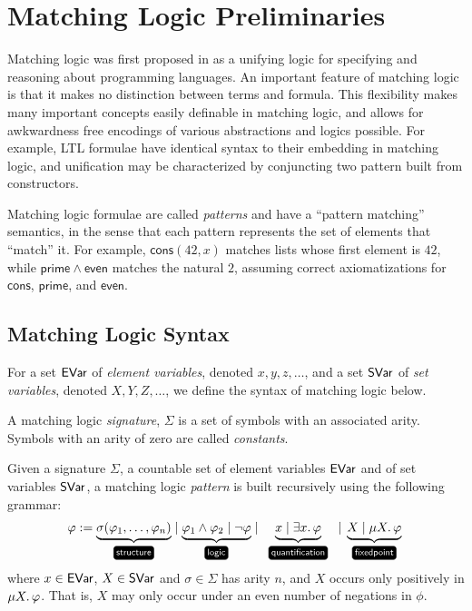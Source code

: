 \hypertarget{sec:ml-prelims}{%
\section{Matching Logic Preliminaries}\label{sec:ml-prelims}}

Matching logic was first proposed in \cite{matchinglogiclmcs} as a unifying logic
for specifying and reasoning about programming languages.
An important feature of matching logic is that it makes no distinction between terms and formula.
This flexibility makes many important concepts easily definable in matching logic,
and allows for awkwardness free encodings of various abstractions and logics possible.
For example,
LTL formulae have identical syntax to their embedding in matching logic,
and unification may be characterized by conjuncting two pattern built from constructors.

Matching logic formulae are called \emph{patterns}
and have a ``pattern matching'' semantics,
in the sense that each pattern represents the set of elements that ``match'' it.
For example, \(\mathsf{cons}(42, x)\) matches lists whose first element is \(42\),
while \(\mathsf{prime} \land \mathsf{even}\) matches the natural \(2\),
assuming correct axiomatizations for \(\mathsf{cons}\), \(\mathsf{prime}\), and \(\mathsf{even}\).

\hypertarget{matching-logic-syntax}{%
\subsection{Matching Logic Syntax}\label{matching-logic-syntax}}

For a set \(\EVar\) of \emph{element variables}, denoted \(x, y, z, \ldots\),
and a set \(\SVar\) of \emph{set variables}, denoted \(X, Y, Z, \ldots\), we define the syntax of matching logic below.

\begin{definition}A matching logic \emph{signature}, \(\Sigma\) is a set of symbols with an associated arity.
Symbols with an arity of zero are called \emph{constants}.\end{definition}

\begin{definition}[Patterns]Given a signature \(\Sigma\), a countable set of element variables \(\EVar\) and of set variables \(\SVar\),
a matching logic \emph{pattern} is built recursively using the following grammar:
\begin{align*}
\phi:=  \underbrace{\sigma(\phi_1, \dots, \phi_n)}      _\text{\structure{}}
  \mid  \underbrace{\phi_1 \land \phi_2 \mid \lnot \phi}_\text{\logic{}}
  \mid  \underbrace{x \mid \exists x \ldotp \phi}       _\text{\quantification}
  \mid  \underbrace{X \mid     \mu X \ldotp \phi}       _\text{\fixedpoint{}}
\end{align*}
where \(x \in \EVar\), \(X \in \SVar\) and \(\sigma \in \Sigma\) has arity \(n\), and \(X\) occurs only positively in \(\mu X\ldotp \phi\). That is, \(X\) may only occur under an even number of negations in \(\phi\).\end{definition}

